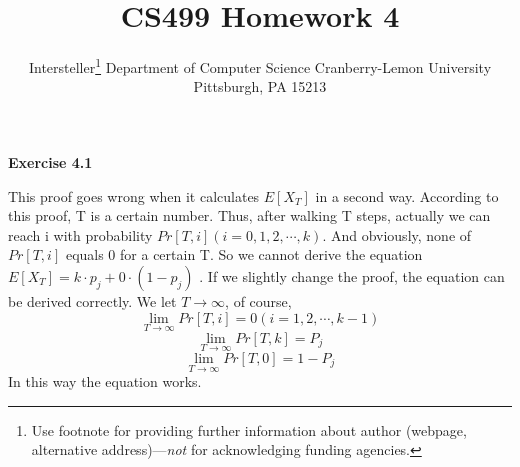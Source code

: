\documentclass{article} %
\title{CS499 Homework 4}
\author{
	Intersteller\thanks{ Use footnote for providing further information
		about author (webpage, alternative address)---\emph{not} for acknowledging
		funding agencies.}
	Department of Computer Science
	Cranberry-Lemon University
	Pittsburgh, PA 15213
}
\begin{document}
	\maketitle
	\textbf{Exercise 4.1}\par
	This proof goes wrong when it calculates $E[X_T]$ in a second way. According to this proof, T is a certain number. Thus, after walking T steps, actually we can reach i with probability $Pr[T,i] (i=0,1,2,\cdots ,k)$. And obviously, none of $Pr[T,i]$ equals 0 for a certain T. So we cannot derive the equation $E[X_T] = k\cdot p_j + 0 \cdot (1-p_j)$ .
	If we slightly change the proof, the equation can be derived correctly. We let $T\to \infty$, of course, $${\lim_{T\to \infty}} Pr[T,i]=0 (i=1,2,\cdots ,k-1)$$ $${\lim_{T\to \infty}}Pr[T,k]=P_j$$ $${\lim_{T\to \infty}} Pr[T,0]=1-P_j$$ In this way the equation works.
\end{document}
